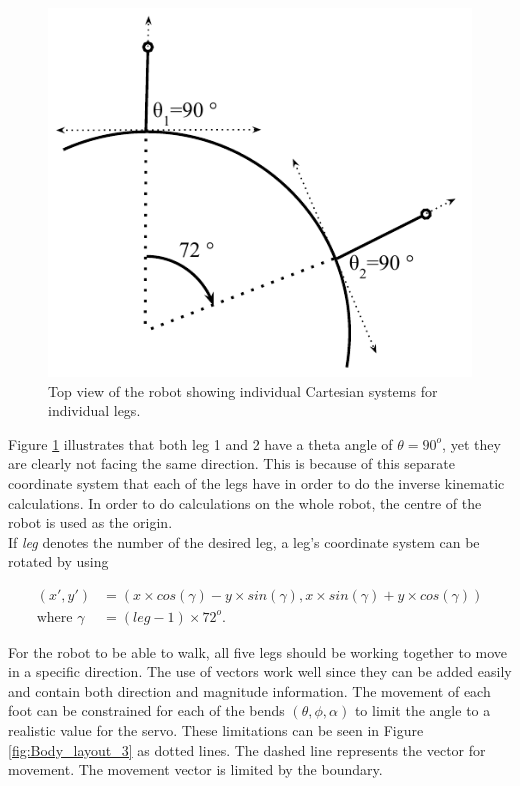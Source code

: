 \FloatBarrier
\begin{figure}[h]
\centering
\includegraphics[scale = 1]{pics/Body_Layout_2.pdf}
\caption{Top view of the robot showing individual Cartesian systems for individual legs.}
\label{fig:Body_layout_2}
\end{figure}
\FloatBarrier

Figure \ref{fig:Body_layout_2} illustrates that both leg 1 and 2 have a theta angle of $\theta = 90^o$, yet they are clearly not facing the same direction. This is because of this separate coordinate system that each of the legs have in order to do the inverse kinematic calculations. In order to do calculations on the whole robot, the centre of the robot is used as the origin.\\

If \textit{leg} denotes the number of the desired leg, a leg's coordinate system can be rotated by using

\begin{align}
\label{eq:rotation}
(x',y') &= (x\times cos(\gamma) -y\times sin(\gamma),x \times sin(\gamma) + y \times cos(\gamma))\\
\text{where }\gamma &= (leg-1)\times 72^o. 
\end{align}

For the robot to be able to walk, all five legs should be working together to move in a specific direction. The use of vectors work well since they can be added easily and contain both direction and magnitude information. The movement of each foot can be constrained for each of the bends $(\theta,\phi,\alpha)$ to limit the angle to a realistic value for the servo. These limitations can be seen in Figure \ref{fig:Body_layout_3} as dotted lines. The dashed line represents the vector for movement. The movement vector is limited by the boundary.

